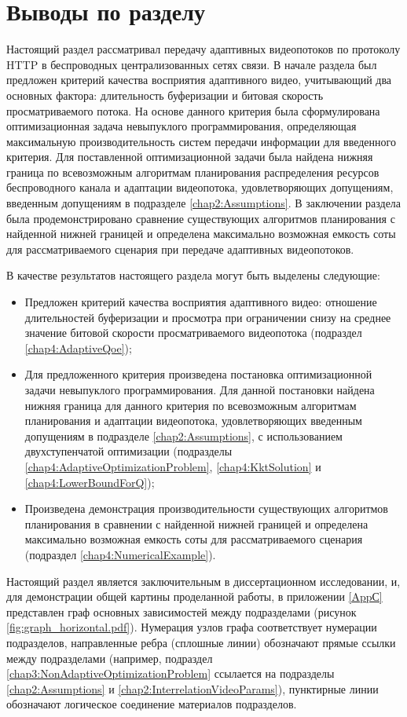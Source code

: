 \section{Выводы по разделу}

Настоящий раздел рассматривал передачу адаптивных видеопотоков по протоколу HTTP в беспроводных централизованных сетях связи. В начале раздела был предложен критерий качества восприятия адаптивного видео, учитывающий два основных фактора: длительность буферизации и битовая скорость просматриваемого потока. На основе данного критерия была сформулирована оптимизационная задача невыпуклого программирования, определяющая максимальную производительность систем передачи информации для введенного критерия. Для поставленной оптимизационной задачи была найдена нижняя граница по всевозможным алгоритмам планирования распределения ресурсов беспроводного канала и адаптации видеопотока, удовлетворяющих допущениям, введенным допущениям в подразделе \ref{chap2:Assumptions}. В заключении раздела была продемонстрировано сравнение существующих алгоритмов планирования с найденной нижней границей и определена максимально возможная емкость соты для рассматриваемого сценария при передаче адаптивных видеопотоков.

В качестве результатов настоящего раздела могут быть выделены следующие:
\begin{itemize}
	\item Предложен критерий качества восприятия адаптивного видео: отношение длительностей буферизации и просмотра при ограничении снизу на среднее значение битовой скорости просматриваемого видеопотока (подраздел \ref{chap4:AdaptiveQoe});
	\item Для предложенного критерия произведена постановка оптимизационной задачи невыпуклого программирования. Для данной постановки найдена нижняя граница для данного критерия по всевозможным алгоритмам планирования и адаптации видеопотока, удовлетворяющих введенным допущениям в подразделе \ref{chap2:Assumptions}, с использованием двухступенчатой оптимизации (подразделы \ref{chap4:AdaptiveOptimizationProblem}, \ref{chap4:KktSolution} и \ref{chap4:LowerBoundForQ});
	\item Произведена демонстрация производительности существующих алгоритмов планирования в сравнении с найденной нижней границей и определена максимально возможная емкость соты для рассматриваемого сценария (подраздел \ref{chap4:NumericalExample}).
\end{itemize}

Настоящий раздел является заключительным в диссертационном исследовании, и, для демонстрации общей картины проделанной работы, в приложении \ref{AppС} представлен граф основных зависимостей между подразделами (рисунок \ref{fig:graph_horizontal.pdf}). Нумерация узлов графа соответствует нумерации подразделов, направленные ребра (сплошные линии) обозначают прямые ссылки между подразделами (например, подраздел \ref{chap3:NonAdaptiveOptimizationProblem} ссылается на подразделы \ref{chap2:Assumptions} и \ref{chap2:InterrelationVideoParams}), пунктирные линии обозначают логическое соединение материалов подразделов.

